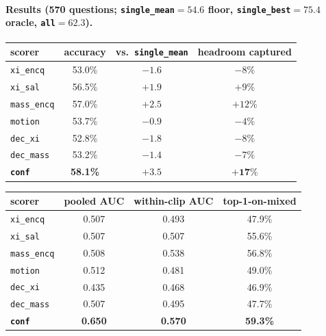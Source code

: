 \documentclass[11pt]{article}
\begin{document}
\paragraph{Results (570 questions; \texttt{single\_mean}$=54.6$ floor, \texttt{single\_best}$=75.4$
oracle, \texttt{all}$=62.3$).}

\begin{center}
\begin{tabular}{lccc}
\toprule
scorer & accuracy & vs.\ \texttt{single\_mean} & headroom captured \\
\midrule
\texttt{xi\_encq}    & 53.0\% & $-1.6$ & $-8\%$ \\
\texttt{xi\_sal}     & 56.5\% & $+1.9$ & $+9\%$ \\
\texttt{mass\_encq}  & 57.0\% & $+2.5$ & $+12\%$ \\
\texttt{motion}      & 53.7\% & $-0.9$ & $-4\%$ \\
\texttt{dec\_xi}     & 52.8\% & $-1.8$ & $-8\%$ \\
\texttt{dec\_mass}   & 53.2\% & $-1.4$ & $-7\%$ \\
\textbf{\texttt{conf}} & \textbf{58.1\%} & $\mathbf{+3.5}$ & $\mathbf{+17\%}$ \\
\bottomrule
\end{tabular}
\end{center}

\begin{center}
\begin{tabular}{lccc}
\toprule
scorer & pooled AUC & within-clip AUC & top-1-on-mixed \\
\midrule
\texttt{xi\_encq}    & 0.507 & 0.493 & 47.9\% \\
\texttt{xi\_sal}     & 0.507 & 0.507 & 55.6\% \\
\texttt{mass\_encq}  & 0.508 & 0.538 & 56.8\% \\
\texttt{motion}      & 0.512 & 0.481 & 49.0\% \\
\texttt{dec\_xi}     & 0.435 & 0.468 & 46.9\% \\
\texttt{dec\_mass}   & 0.507 & 0.495 & 47.7\% \\
\textbf{\texttt{conf}} & \textbf{0.650} & \textbf{0.570} & \textbf{59.3\%} \\
\bottomrule
\end{tabular}
\end{center}
\end{document}
